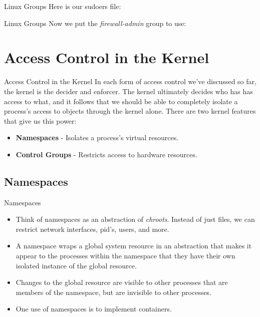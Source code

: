 \documentclass{beamer}
\begin{document}
\begin{frame}{Linux Groups}
Here is our sudoers file:

\end{frame}

\begin{frame}{Linux Groups}
Now we put the \textit{firewall-admin} group to use:

\end{frame}

\section{Access Control in the Kernel}

\begin{frame}{Access Control in the Kernel}
In each form of access control we've discussed so far, the kernel is the decider and enforcer.
The kernel ultimately decides who has has access to what, and it follows that we should be able to completely isolate a process's access to objects through the kernel alone.
There are two kernel features that give us this power:
\begin{itemize}
\item \textbf{Namespaces} - Isolates a process's virtual resources.
\item \textbf{Control Groups} - Restricts access to hardware resources.
\end{itemize}
\end{frame}

\subsection{Namespaces}

\begin{frame}{Namespaces}
\begin{itemize}
\item Think of namespaces as an abstraction of \textit{chroots}. Instead of just files, we can restrict network interfaces, pid's, users, and more.
\item A  namespace  wraps  a  global system resource in an abstraction that makes it appear to the processes within the namespace that they have their own isolated instance of the global resource.
\item Changes to the global resource are visible to other processes that are members of the namespace, but are invisible to other processes.
\item One use  of  namespaces is to implement containers.
\end{itemize}
\end{frame}
\end{document}
